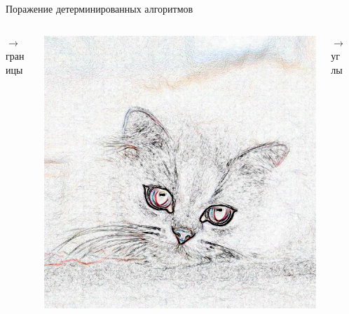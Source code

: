 \documentclass[aspectratio=169, professionalfonts]{beamer}
\begin{document}
\begin{frame}{Поражение детерминированных алгоритмов}
\begin{columns}
\begin{column}{.15\linewidth}
            \centering
            \( \longrightarrow \) \\
            границы
        \end{column}
        \begin{column}{.25\linewidth}
            \includegraphics[width=\linewidth]{figures/fig26-cat-filtered.jpg}
        \end{column}
        \begin{column}{.15\linewidth}
            \centering
            \( \longrightarrow \) \\
            углы
        \end{column}
        \begin{column}{.07\linewidth}

\end{column}
\end{columns}
\end{frame}
\end{document}
